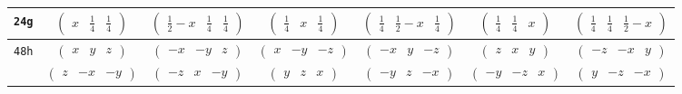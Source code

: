 \documentclass[fleqn,9pt,landscape]{jsarticle}
\begin{document}
\begin{center}
\begin{longtable}{ccccccc}
{\tt 24g} & $ \begin{pmatrix} x & \frac{1}{4} & \frac{1}{4} \end{pmatrix} $ & $ \begin{pmatrix} \frac{1}{2} - x & \frac{1}{4} & \frac{1}{4} \end{pmatrix} $ & $ \begin{pmatrix} \frac{1}{4} & x & \frac{1}{4} \end{pmatrix} $ & $ \begin{pmatrix} \frac{1}{4} & \frac{1}{2} - x & \frac{1}{4} \end{pmatrix} $ & $ \begin{pmatrix} \frac{1}{4} & \frac{1}{4} & x \end{pmatrix} $ & $ \begin{pmatrix} \frac{1}{4} & \frac{1}{4} & \frac{1}{2} - x \end{pmatrix} $ \\ \hline
{\tt 48h} & $ \begin{pmatrix} x & y & z \end{pmatrix} $ & $ \begin{pmatrix} - x & - y & z \end{pmatrix} $ & $ \begin{pmatrix} x & - y & - z \end{pmatrix} $ & $ \begin{pmatrix} - x & y & - z \end{pmatrix} $ & $ \begin{pmatrix} z & x & y \end{pmatrix} $ & $ \begin{pmatrix} - z & - x & y \end{pmatrix} $ \\
& $ \begin{pmatrix} z & - x & - y \end{pmatrix} $ & $ \begin{pmatrix} - z & x & - y \end{pmatrix} $ & $ \begin{pmatrix} y & z & x \end{pmatrix} $ & $ \begin{pmatrix} - y & z & - x \end{pmatrix} $ & $ \begin{pmatrix} - y & - z & x \end{pmatrix} $ & $ \begin{pmatrix} y & - z & - x \end{pmatrix} $ \\
\end{longtable}
\end{center}
\end{document}
